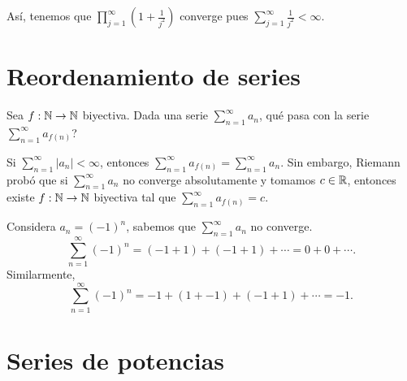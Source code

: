 \begin{eg}
\normalfont Así, tenemos que $\displaystyle \prod^{\infty}_{j=1}\left(1 + \frac{1}{j^{2}}\right) $ converge pues $\displaystyle \sum^{\infty}_{j=1}\frac{1}{j^{2}}<\infty $.
\end{eg}

\chapter{Reordenamiento de series}

Sea $\displaystyle f: \mathbb{N} \to \mathbb{N} $ biyectiva. Dada una serie $\displaystyle \sum^{\infty}_{n = 1}a_{n} $, qué pasa con la serie $\displaystyle \sum^{\infty}_{n = 1}a_{f\left(n\right)} $?
\begin{ftheorem}[]
\normalfont Si $\displaystyle \sum^{\infty}_{n = 1} \left|a_{n}\right| < \infty $, entonces $\displaystyle \sum^{\infty}_{n = 1} a_{f\left(n\right)} = \sum^{\infty}_{n = 1}a_{n} $. Sin embargo, Riemann probó que si $\displaystyle \sum^{\infty}_{n = 1}a_{n} $ no converge absolutamente y tomamos $\displaystyle c \in \mathbb{R} $, entonces existe $\displaystyle f : \mathbb{N} \to \mathbb{N} $ biyectiva tal que $\displaystyle \sum^{\infty}_{n = 1}a_{f\left(n\right)} = c . $ 
\end{ftheorem}

\begin{eg}
\normalfont Considera $\displaystyle a_{n} = \left(-1\right)^{n} $, sabemos que $\displaystyle \sum^{\infty}_{n = 1}a_{n} $ no converge. 
\[\sum^{\infty}_{n=1}\left(-1\right)^{n} = \left(-1+1\right) + \left(-1+1\right) + \cdots = 0 + 0 + \cdots .\]
Similarmente, 
\[\sum^{\infty}_{n = 1}\left(-1\right)^{n} = -1 + \left(1 + -1\right) + \left(-1+1\right) + \cdots = -1 .\]
\end{eg}

\chapter{Series de potencias}

